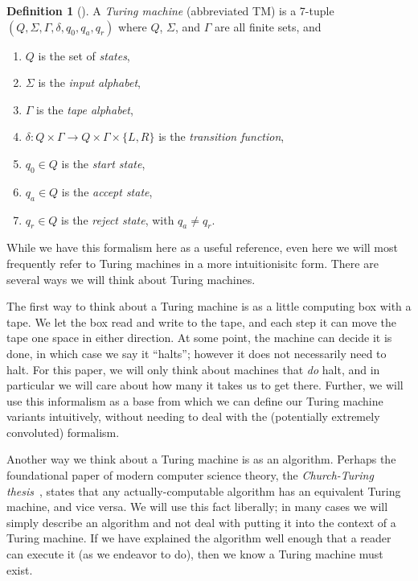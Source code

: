 \documentclass[english,12pt]{reedthesis}
\theoremstyle{plain}
\theoremstyle{definition}
\newtheorem{defn}[defn]{Definition}
\theoremstyle{remark}
\begin{document}
\begin{defn}[{\cite[Def.\ 3.1]{Sip97}}]\label{def:TM}
  A \emph{Turing machine} (abbreviated TM) is a 7-tuple
  $(Q, \Sigma, \Gamma, \delta, q_{0}, q_{a}, q_{r})$ where $Q$, $\Sigma$, and $\Gamma$ are all finite
  sets, and
  \begin{enumerate}
    \item $Q$ is the set of \emph{states},
    \item $\Sigma$ is the \emph{input alphabet},
    \item $\Gamma$ is the \emph{tape alphabet},
    \item $\delta\colon Q \times \Gamma \rightarrow Q \times \Gamma \times \{L, R\}$ is the \emph{transition function},
    \item $q_{0} \in Q$ is the \emph{start state},
    \item $q_{a} \in Q$ is the \emph{accept state},
    \item $q_{r} \in Q$ is the \emph{reject state}, with $q_{a} \ne q_{r}$.
  \end{enumerate}
\end{defn}

While we have this formalism here as a useful reference, even here we will most
frequently refer to Turing machines in a more intuitionisitc form. There are
several ways we will think about Turing machines.

The first way to think about a Turing machine is as a little computing box with
a tape. We let the box read and write to the tape, and each step it can move the
tape one space in either direction. At some point, the machine can decide it is
done, in which case we say it ``halts''; however it does not necessarily need to
halt. For this paper, we will only think about machines that \emph{do} halt, and
in particular we will care about how many it takes us to get there. Further, we
will use this informalism as a base from which we can define our Turing machine
variants intuitively, without needing to deal with the (potentially extremely
convoluted) formalism.

Another way we think about a Turing machine is as an algorithm. Perhaps the
foundational paper of modern computer science theory, the \emph{Church-Turing
  thesis}~\cite{Tur36}, states that any actually-computable algorithm has an
equivalent Turing machine, and vice versa. We will use this fact liberally; in
many cases we will simply describe an algorithm and not deal with putting it
into the context of a Turing machine. If we have explained the algorithm well
enough that a reader can execute it (as we endeavor to do), then we know a
Turing machine must exist.
\end{document}
